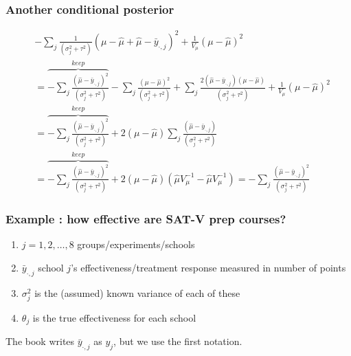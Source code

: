 \documentclass{beamer}
\begin{document}
\begin{frame}
\frametitle{Another conditional posterior }


\begin{align*}
&-\sum_j \frac{1}{ (\sigma^2_j + \tau^2) } (\mu -  \hat{\mu} + \hat{\mu} - \bar{y}_{\cdot,j}  )^2 + \frac{1}{ V_{\mu} } (\mu -\hat{\mu} )^2 \\
&= \overbrace{- \sum_j \frac{(\hat{\mu} - \bar{y}_{\cdot,j})^2}{ (\sigma^2_j + \tau^2) }}^{keep} - \sum_j \frac{(\mu -  \hat{\mu})^2}{ (\sigma^2_j + \tau^2) }  + \sum_j \frac{2(\hat{\mu} - \bar{y}_{\cdot,j})(\mu -  \hat{\mu})}{ (\sigma^2_j + \tau^2) }+ \frac{1}{ V_{\mu} } (\mu -\hat{\mu} )^2 \\
&= \overbrace{- \sum_j \frac{(\hat{\mu} - \bar{y}_{\cdot,j})^2}{ (\sigma^2_j + \tau^2) }}^{keep}   + 2 (\mu -  \hat{\mu})\sum_j \frac{(\hat{\mu} - \bar{y}_{\cdot,j})}{ (\sigma^2_j + \tau^2) }  \\
&= \overbrace{- \sum_j \frac{(\hat{\mu} - \bar{y}_{\cdot,j})^2}{ (\sigma^2_j + \tau^2) }}^{keep}   + 2 (\mu -  \hat{\mu})(\hat{\mu}V_{\mu}^{-1} - \hat{\mu}V_{\mu}^{-1} )  = - \sum_j \frac{(\hat{\mu} - \bar{y}_{\cdot,j})^2}{ (\sigma^2_j + \tau^2) }
\end{align*}



\end{frame}


\begin{frame}
\frametitle{Example : how effective are SAT-V prep courses? }

\begin{enumerate}
\item $j=1,2,\ldots,8$ groups/experiments/schools
\item $\bar{y}_{\cdot,j}$ school $j$'s effectiveness/treatment response measured in number of points
\item $\sigma^2_j$ is the (assumed) known variance of each of these
\item $\theta_j$ is the true effectiveness for each school
\end{enumerate}

The book writes $\bar{y}_{\cdot,j}$ as $y_j$, but we use the first notation.


\end{frame}
\end{document}
